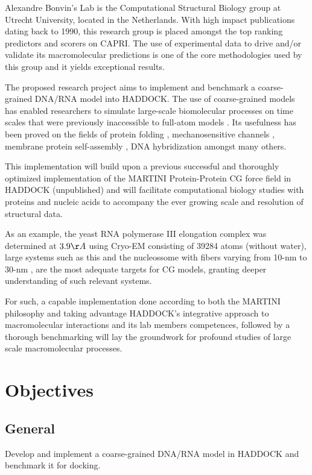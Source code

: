 \documentclass[
	12pt,				%
	openright,			%
	twoside,			%
	a4paper,			%
	english,			%
	french,				%
	spanish,			%
	brazil,				%
	]{abntex2}
\begin{document}
Alexandre Bonvin’s Lab is the Computational Structural Biology group at Utrecht University, located in the Netherlands. With high impact publications dating back to 1990, this research group is placed amongst the top ranking predictors and scorers on CAPRI. The use of experimental data to drive and/or validate its macromolecular predictions is one of the core methodologies used by this group and it yields exceptional results.

The proposed research project aims to implement and benchmark a coarse-grained DNA/RNA model into HADDOCK. The use of coarse-grained models has enabled researchers to simulate large-scale biomolecular processes on time scales that were previously inaccessible to full-atom models \cite{Inglfsson2013}. Its usefulness has been proved on the fields of protein folding \cite{Liwo1997}, mechanosensitive channels \cite{Louhivuori2010}, membrane protein self-assembly \cite{Periole2007} , DNA hybridization \cite{Sambriski2009} amongst many others. 

This implementation will build upon a previous successful and thoroughly optimized implementation of the MARTINI Protein-Protein CG force field in HADDOCK (unpublished) and will facilitate computational biology studies with proteins and nucleic acids to accompany the ever growing scale and resolution of structural data.

As an example, the yeast RNA polymerase III elongation complex was determined at $3.9\AA$ using Cryo-EM \cite{Hoffmann2015} consisting of 39284 atoms (without water), large systems such as this and the nucleossome with fibers varying from 10-nm to 30-nm \cite{Silva2015}, are the most adequate targets for CG models, granting deeper understanding of such relevant systems.

For such, a capable implementation done according to both the MARTINI philosophy and taking advantage HADDOCK’s integrative approach to macromolecular interactions and its lab members competences, followed by a thorough benchmarking will lay the groundwork for profound studies of large scale macromolecular processes.	

\chapter{Objectives}
\section{General}
Develop and implement a coarse-grained DNA/RNA model in HADDOCK and benchmark it for docking.
\end{document}
